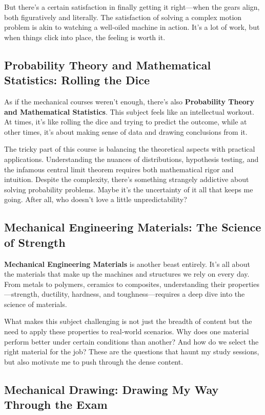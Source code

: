 \documentclass[a4paper]{article} 	%
\begin{document}
But there’s a certain satisfaction in finally getting it right—when the gears align, both figuratively and literally. The satisfaction of solving a complex motion problem is akin to watching a well-oiled machine in action. It’s a lot of work, but when things click into place, the feeling is worth it.

\subsection*{Probability Theory and Mathematical Statistics: Rolling the Dice}

As if the mechanical courses weren’t enough, there’s also \textbf{Probability Theory and Mathematical Statistics}. This subject feels like an intellectual workout. At times, it’s like rolling the dice and trying to predict the outcome, while at other times, it’s about making sense of data and drawing conclusions from it. 

The tricky part of this course is balancing the theoretical aspects with practical applications. Understanding the nuances of distributions, hypothesis testing, and the infamous central limit theorem requires both mathematical rigor and intuition. Despite the complexity, there’s something strangely addictive about solving probability problems. Maybe it’s the uncertainty of it all that keeps me going. After all, who doesn’t love a little unpredictability?

\subsection*{Mechanical Engineering Materials: The Science of Strength}

\textbf{Mechanical Engineering Materials} is another beast entirely. It’s all about the materials that make up the machines and structures we rely on every day. From metals to polymers, ceramics to composites, understanding their properties—strength, ductility, hardness, and toughness—requires a deep dive into the science of materials.

What makes this subject challenging is not just the breadth of content but the need to apply these properties to real-world scenarios. Why does one material perform better under certain conditions than another? And how do we select the right material for the job? These are the questions that haunt my study sessions, but also motivate me to push through the dense content.

\subsection*{Mechanical Drawing: Drawing My Way Through the Exam}
\end{document}
